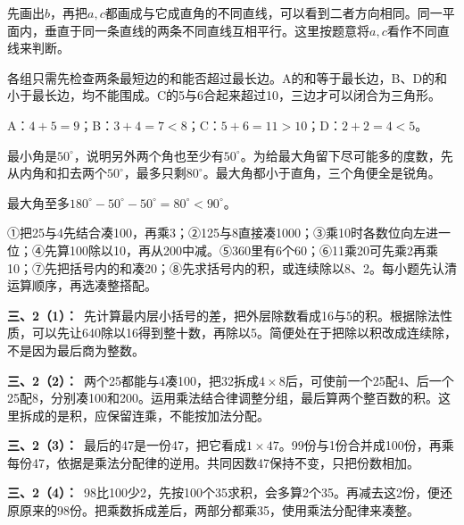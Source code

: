 \documentclass[multi=snippet,border=0pt]{standalone}
\newenvironment{snippet}[3]{\begin{minipage}{#1bp}\color{answerred}\fontsize{#2}{#3}\selectfont\raggedright}{\end{minipage}}
\begin{document}
\begin{snippet}{505}{11.5}{14}先画出\(b\)，再把\(a,c\)都画成与它成直角的不同直线，可以看到二者方向相同。同一平面内，垂直于同一条直线的两条不同直线互相平行。这里按题意将\(a,c\)看作不同直线来判断。\end{snippet}
\begin{snippet}{505}{11.5}{14}各组只需先检查两条最短边的和能否超过最长边。A的和等于最长边，B、D的和小于最长边，均不能围成。C的5与6合起来超过10，三边才可以闭合为三角形。\par A：\(4+5=9\)；B：\(3+4=7<8\)；C：\(5+6=11>10\)；D：\(2+2=4<5\)。\end{snippet}
\begin{snippet}{505}{11.5}{14}最小角是\(50^\circ\)，说明另外两个角也至少有\(50^\circ\)。为给最大角留下尽可能多的度数，先从内角和扣去两个\(50^\circ\)，最多只剩\(80^\circ\)。最大角都小于直角，三个角便全是锐角。\par 最大角至多\(180^\circ-50^\circ-50^\circ=80^\circ<90^\circ\)。\end{snippet}
\begin{snippet}{505}{11.5}{14}①把25与4先结合凑100，再乘3；②125与8直接凑1000；③乘10时各数位向左进一位；④先算100除以10，再从200中减。⑤360里有6个60；⑥11乘20可先乘2再乘10；⑦先把括号内的和凑20；⑧先求括号内的积，或连续除以8、2。每小题先认清运算顺序，再选凑整搭配。\end{snippet}
\begin{snippet}{505}{11.5}{14}\textbf{三、2（1）：}\ 先计算最内层小括号的差，把外层除数看成16与5的积。根据除法性质，可以先让640除以16得到整十数，再除以5。简便处在于把除以积改成连续除，不是因为最后商为整数。\end{snippet}
\begin{snippet}{505}{11.5}{14}\textbf{三、2（2）：}\ 两个25都能与4凑100，把32拆成\(4\times8\)后，可使前一个25配4、后一个25配8，分别凑100和200。运用乘法结合律调整分组，最后算两个整百数的积。这里拆成的是积，应保留连乘，不能按加法分配。\end{snippet}
\begin{snippet}{505}{11.5}{14}\textbf{三、2（3）：}\ 最后的47是一份47，把它看成\(1\times47\)。99份与1份合并成100份，再乘每份47，依据是乘法分配律的逆用。共同因数47保持不变，只把份数相加。\end{snippet}
\begin{snippet}{505}{11.5}{14}\textbf{三、2（4）：}\ 98比100少2，先按100个35求积，会多算2个35。再减去这2份，便还原原来的98份。把乘数拆成差后，两部分都乘35，使用乘法分配律来凑整。\end{snippet}
\end{document}
